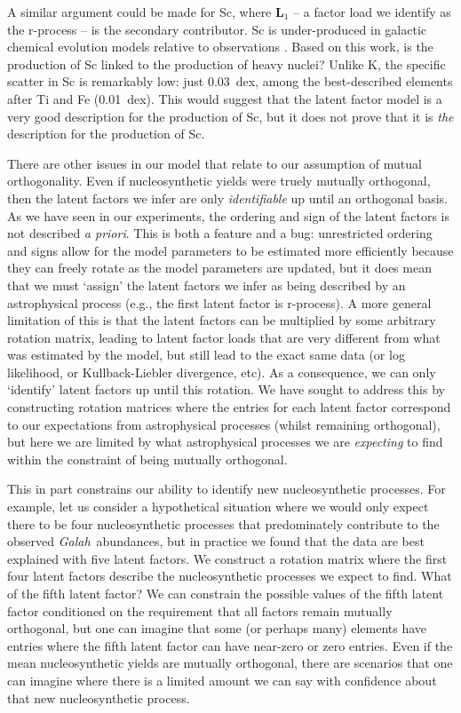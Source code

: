 \documentclass[twocolumn]{aastex62}
\newcommand{\project}[1]{\textsl{#1}}
\newcommand{\Galah}{\project{Galah}}
\begin{document}
A similar argument could be made for Sc, where $\mathbf{L}_1$ -- a factor load we
identify as the r-process -- is the secondary contributor. Sc is under-produced in 
galactic chemical evolution models relative to observations \citep{Kobayashi:2006,Casey:2015}.
Based on this work, is the production of Sc linked to the production of heavy nuclei? 
Unlike K, the specific scatter in Sc is remarkably low: just 0.03~dex, among the
best-described elements after Ti and Fe (0.01~dex). This would suggest that the
latent factor model is a very good description for the production of Sc, but it
does not prove that it is \emph{the} description for the production of Sc.


There are other issues in our model that relate to our assumption of mutual
orthogonality. Even if nucleosynthetic yields were truely mutually orthogonal,
then the latent factors we infer are only \emph{identifiable} up until an
orthogonal basis. As we have seen in our experiments, the ordering and sign 
of the latent factors is not described \emph{a priori}. This is both a feature
and a bug: unrestricted ordering and signs allow for the model parameters to be
estimated more efficiently because they can freely rotate as the model
parameters are updated, but it does mean that we
must `assign' the latent factors we infer as being described by an astrophysical
process (e.g., the first latent factor is r-process). A more general limitation
of this is that the latent factors can be multiplied by some arbitrary rotation
matrix, leading to latent factor loads that are very different from what was
estimated by the model, but still lead to the exact same data (or log likelihood,
or Kullback-Liebler divergence, etc). As a consequence, we can only `identify'
latent factors up until this rotation. We have sought to address this by constructing
rotation matrices where the entries for each latent factor correspond to our expectations
from astrophysical processes (whilst remaining orthogonal), but here we are limited
by what astrophysical processes we are \emph{expecting} to find within the constraint
of being mutually orthogonal.


This in part constrains our ability to identify new nucleosynthetic processes. For example,
let us consider a hypothetical situation where we would only expect there to be four 
nucleosynthetic processes that predominately contribute to the observed \Galah\ abundances,
but in practice we found that the data are best explained with
five latent factors. We construct a rotation matrix where the first four latent factors
describe the nucleosynthetic processes we expect to find. What of the fifth latent
factor? We can constrain the possible values of the fifth latent factor conditioned on
the requirement that all factors remain mutually orthogonal, but one can imagine that
some (or perhaps many) elements have entries where the fifth latent factor can have
near-zero or zero entries. Even if the mean nucleosynthetic yields are mutually
orthogonal, there are scenarios that one can imagine where there is a limited amount
we can say with confidence about that new nucleosynthetic process.
\end{document}
